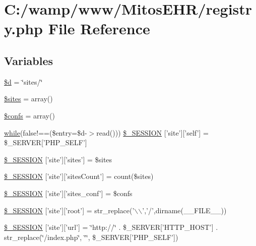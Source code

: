 \hypertarget{registry_8php}{\section{\-C\-:/wamp/www/\-Mitos\-E\-H\-R/registry.php \-File \-Reference}
\label{registry_8php}
}
\subsection*{\-Variables}
\begin{DoxyCompactItemize}
\item 
\hyperlink{registry_8php_a2bfbfe94d4b57f90c318fcad68f64732}{\$d} = \char`\"{}sites/\char`\"{}
\item 
\hyperlink{registry_8php_a0692cce65f606b088875d5853da442f1}{\$sites} = array()
\item 
\hyperlink{registry_8php_a95787ffe38852d43a64a75d95f5feb88}{\$confs} = array()
\item 
\hyperlink{lib_2php_thumbs-1_87_89_2demo_2index_8php_a28ef4f834fa32da6e8b4681497a3afba}{while}(false!==(\$entry=\$d-\/$>$read())) \hyperlink{registry_8php_a6bc6b477e436c6e6ec340bbbb3cc2a79}{\$\-\_\-\-S\-E\-S\-S\-I\-O\-N} \mbox{[}'site'\mbox{]}\mbox{[}'self'\mbox{]} = \$\-\_\-\-S\-E\-R\-V\-E\-R\mbox{[}'\-P\-H\-P\-\_\-\-S\-E\-L\-F'\mbox{]}
\item 
\hyperlink{registry_8php_a505edf022e6892effb92f9c9a074b8d7}{\$\-\_\-\-S\-E\-S\-S\-I\-O\-N} \mbox{[}'site'\mbox{]}\mbox{[}'sites'\mbox{]} = \$sites
\item 
\hyperlink{registry_8php_a1f620b114c18cb3aad5cf1969545da3f}{\$\-\_\-\-S\-E\-S\-S\-I\-O\-N} \mbox{[}'site'\mbox{]}\mbox{[}'sites\-Count'\mbox{]} = count(\$sites)
\item 
\hyperlink{registry_8php_a1861ce240ebe27ceb04f3ec0575fe52f}{\$\-\_\-\-S\-E\-S\-S\-I\-O\-N} \mbox{[}'site'\mbox{]}\mbox{[}'sites\-\_\-conf'\mbox{]} = \$confs
\item 
\hyperlink{registry_8php_a412d5becb89bcaab6201484460b4d40b}{\$\-\_\-\-S\-E\-S\-S\-I\-O\-N} \mbox{[}'site'\mbox{]}\mbox{[}'root'\mbox{]} = str\-\_\-replace('$\backslash$$\backslash$','/',dirname(\-\_\-\-\_\-\-F\-I\-L\-E\-\_\-\-\_\-))
\item 
\hyperlink{registry_8php_ab2cf02dd828a414e71913943a07bb9d4}{\$\-\_\-\-S\-E\-S\-S\-I\-O\-N} \mbox{[}'site'\mbox{]}\mbox{[}'url'\mbox{]} = \char`\"{}http\-://\char`\"{} . \$\-\_\-\-S\-E\-R\-V\-E\-R\mbox{[}'\-H\-T\-T\-P\-\_\-\-H\-O\-S\-T'\mbox{]} . str\-\_\-replace(\char`\"{}/index.\-php\char`\"{}, \char`\"{}\char`\"{}, \$\-\_\-\-S\-E\-R\-V\-E\-R\mbox{[}'\-P\-H\-P\-\_\-\-S\-E\-L\-F'\mbox{]})
$$
\end{DoxyCompactItemize}
